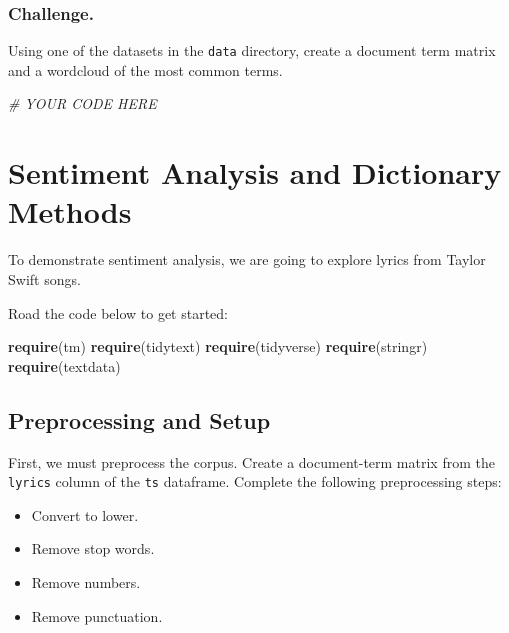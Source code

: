 \documentclass[]{book}
\newenvironment{Shaded}{\begin{snugshade}}{\end{snugshade}}
\newcommand{\KeywordTok}[1]{\textcolor[rgb]{0.13,0.29,0.53}{\textbf{#1}}}
\newcommand{\CommentTok}[1]{\textcolor[rgb]{0.56,0.35,0.01}{\textit{#1}}}
\newcommand{\NormalTok}[1]{#1}
\providecommand{\tightlist}{%
  \setlength{\itemsep}{0pt}\setlength{\parskip}{0pt}}
\begin{document}
\subsubsection{Challenge.}\label{challenge.-1}

Using one of the datasets in the \texttt{data} directory, create a
document term matrix and a wordcloud of the most common terms.

\begin{Shaded}
\begin{Highlighting}[]
\CommentTok{# YOUR CODE HERE}
\end{Highlighting}
\end{Shaded}

\section{Sentiment Analysis and Dictionary
Methods}\label{sentiment-analysis-and-dictionary-methods}

To demonstrate sentiment analysis, we are going to explore lyrics from
Taylor Swift songs.

Road the code below to get started:

\begin{Shaded}
\begin{Highlighting}[]
\KeywordTok{require}\NormalTok{(tm)}
\KeywordTok{require}\NormalTok{(tidytext)}
\KeywordTok{require}\NormalTok{(tidyverse)}
\KeywordTok{require}\NormalTok{(stringr)}
\KeywordTok{require}\NormalTok{(textdata)}
\end{Highlighting}
\end{Shaded}

\subsection{Preprocessing and Setup}\label{preprocessing-and-setup}

First, we must preprocess the corpus. Create a document-term matrix from
the \texttt{lyrics} column of the \texttt{ts} dataframe. Complete the
following preprocessing steps:

\begin{itemize}
\tightlist
\item
  Convert to lower.
\item
  Remove stop words.
\item
  Remove numbers.
\item
  Remove punctuation.
\end{itemize}
\end{document}
